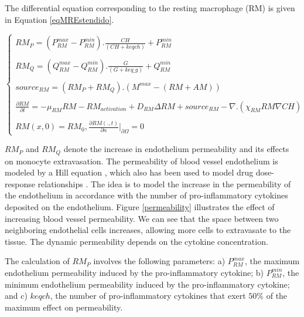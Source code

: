 \documentclass[10pt]{bmc_article}
\newenvironment{bmcformat}{\baselineskip20pt\sloppy\setboolean{publ}{false}}{\baselineskip20pt\sloppy}
\begin{document}
\begin{bmcformat}
The differential equation corresponding to the resting macrophage (RM) is given in Equation \ref{eqMREstendido}.

\begin{equation}
\label{eqMREstendido}
 \begin{cases} 
RM_{P} = (P^{max}_{RM} - P^{min}_{RM}).\frac{CH}{(CH + keqch)} + P^{min}_{RM}\\\\
RM_{Q} = (Q^{max}_{RM} - Q^{min}_{RM}).\frac{G}{(G + keq\_g)} + Q^{min}_{RM}\\\\
source_{RM} = (RM_{P} + RM_{Q}).(M^{max} - (RM + AM))\\  \\
\frac{\partial RM}{\partial t} = -\mu_{RM} RM - RM_{activation} + D_{RM} \Delta RM + source_{RM} - \nabla. (\chi_{RM} RM \nabla CH)  \\\\
RM(x,0) = RM_0, \frac{\partial RM(.,t)}{\partial n} |_{\partial\Omega} = 0
 \end{cases}
\end{equation}

$RM_{P}$ and $RM_{Q}$ denote the increase in endothelium permeability and its effects on monocyte extravasation. The permeability of 
blood vessel endothelium is modeled by a Hill equation \cite{Goutelle2008}, which also has been used to model drug dose-response 
relationships \cite{Wagner1968}. The idea is to model the increase in the permeability of the endothelium in accordance with the 
number of pro-inflammatory cytokines deposited on the endothelium. Figure \ref{permeability} illustrates the effect of increasing  
blood vessel permeability. We can see that the space between two neighboring endothelial cells increases, 
allowing more cells to extravasate to the tissue. The dynamic permeability depends on the cytokine concentration. 


The calculation of $RM_{P}$ involves the following parameters: a) $P^{max}_{RM}$, the maximum endothelium permeability induced by the 
pro-inflammatory cytokine; b) $P^{min}_{RM}$, the minimum endothelium permeability induced by the pro-inflammatory cytokine; and 
c) $keqch$, the number of pro-inflammatory cytokines that exert $50\%$ of the maximum effect on permeability. 


\end{bmcformat}
\end{document}
